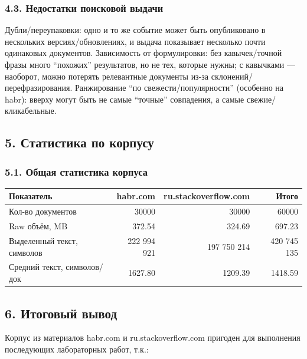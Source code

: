 \documentclass[12pt,a4paper]{article}
\begin{document}
\subsubsection*{4.3. Недостатки поисковой выдачи}

Дубли/переупаковки: одно и то же событие может быть опубликовано в нескольких версиях/обновлениях, и выдача показывает несколько почти одинаковых документов.
\newline
Зависимость от формулировки: без кавычек/точной фразы много “похожих” результатов, но не тех, которые нужны; с кавычками — наоборот, можно потерять релевантные документы из-за склонений/перефразирования. 
\newline
Ранжирование “по свежести/популярности” (особенно на habr): вверху могут быть не самые “точные” совпадения, а самые свежие/кликабельные.

\subsection*{5. Статистика по корпусу}

\subsubsection*{5.1. Общая статистика корпуса}

\begin{table}[h!]
\centering
\small
\begin{tabularx}{\textwidth}{@{}Xrrr@{}}
\toprule
Показатель & habr.com & ru.stackoverflow.com & Итого \\
\midrule
Кол-во документов & 30000 & 30000 & 60000 \\
Raw объём, MB & 372.54 & 324.69 & 697.23 \\
Выделенный текст, символов & 222 994 921 & 197 750 214 & 420 745 135 \\
Средний текст, символов/док & 1627.80 & 1209.39 & 1418.59 \\
\bottomrule
\end{tabularx}
\end{table}



\subsection*{6. Итоговый вывод}

Корпус из материалов habr.com и ru.stackoverflow.com пригоден для выполнения последующих лабораторных работ, т.к.:
\end{document}
